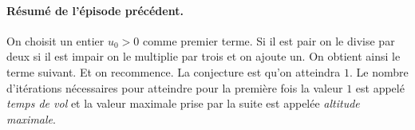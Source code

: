 


\thispagestyle{empty}
\vspace{-1.5cm}
\paragraph{Résumé de l'épisode précédent.} On choisit un entier $u_0 > 0$ comme premier terme. Si il est pair on le divise par deux si il est impair on le multiplie par trois et on ajoute un. On obtient ainsi le terme suivant. Et on recommence. La conjecture est qu'on atteindra $1$. Le nombre d'itérations nécessaires pour atteindre pour la première fois la valeur $1$ est appelé \emph{temps de vol} et la valeur maximale prise par la suite est appelée \emph{altitude maximale}.


